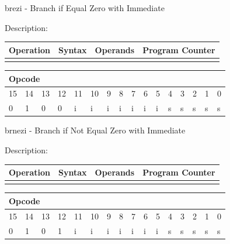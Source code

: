 \documentclass[%
	pdftex,
	a4paper,
	oneside,
	bibtotoc,%
	idxtotoc,%
	bibtotocnumbered,
	halfparskip,%
]{scrbook}
\begin{document}
\bigskip

brezi - Branch if Equal Zero with Immediate

Description:

\begin{tabular}{|l|l|l|l|}
\hline
Operation & Syntax & Operands & Program Counter \\ \hline
&  &  &  \\ \hline
\end{tabular}

\begin{tabular}{|c|c|c|c|c|c|c|c|c|c|c|c|c|c|c|c|}
\hline
\multicolumn{6}{|l|}{Opcode} & \multicolumn{5}{|l|}{} & \multicolumn{5}{|l|}{
} \\ \hline
15 & 14 & 13 & 12 & 11 & 10 & 9 & 8 & 7 & 6 & 5 & 4 & 3 & 2 & 1 & 0 \\ \hline
\multicolumn{1}{|l|}{0} & \multicolumn{1}{|l|}{1} & \multicolumn{1}{|l|}{0}
& \multicolumn{1}{|l|}{0} & \multicolumn{1}{|l|}{i} & \multicolumn{1}{|l|}{i}
& \multicolumn{1}{|l|}{i} & \multicolumn{1}{|l|}{i} & \multicolumn{1}{|l|}{i}
& \multicolumn{1}{|l|}{i} & \multicolumn{1}{|l|}{i} & \multicolumn{1}{|l|}{s}
& \multicolumn{1}{|l|}{s} & \multicolumn{1}{|l|}{s} & \multicolumn{1}{|l|}{s}
& \multicolumn{1}{|l|}{s} \\ \hline
\end{tabular}

\bigskip

brnezi - Branch if Not Equal Zero with Immediate

Description:

\begin{tabular}{|l|l|l|l|}
\hline
Operation & Syntax & Operands & Program Counter \\ \hline
&  &  &  \\ \hline
\end{tabular}

\begin{tabular}{|c|c|c|c|c|c|c|c|c|c|c|c|c|c|c|c|}
\hline
\multicolumn{6}{|l|}{Opcode} & \multicolumn{5}{|l|}{} & \multicolumn{5}{|l|}{
} \\ \hline
15 & 14 & 13 & 12 & 11 & 10 & 9 & 8 & 7 & 6 & 5 & 4 & 3 & 2 & 1 & 0 \\ \hline
\multicolumn{1}{|l|}{0} & \multicolumn{1}{|l|}{1} & \multicolumn{1}{|l|}{0}
& \multicolumn{1}{|l|}{1} & \multicolumn{1}{|l|}{i} & \multicolumn{1}{|l|}{i}
& \multicolumn{1}{|l|}{i} & \multicolumn{1}{|l|}{i} & \multicolumn{1}{|l|}{i}
& \multicolumn{1}{|l|}{i} & \multicolumn{1}{|l|}{i} & \multicolumn{1}{|l|}{s}
& \multicolumn{1}{|l|}{s} & \multicolumn{1}{|l|}{s} & \multicolumn{1}{|l|}{s}
& \multicolumn{1}{|l|}{s} \\ \hline
\end{tabular}
\end{document}
